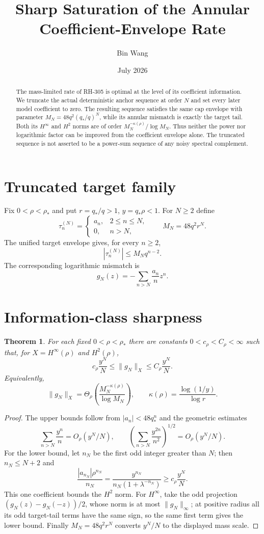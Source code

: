 \documentclass[11pt]{article}
\title{Sharp Saturation of the Annular Coefficient-Envelope Rate}
\author{Bin Wang}\date{July 2026}
\newtheorem{theorem}{Theorem}[section]
\theoremstyle{remark}\newtheorem{remark}[theorem]{Remark}
\begin{document}
\maketitle
\begin{abstract}
The mass-limited rate of RH-305 is optimal at the level of its coefficient
information.  We truncate the actual deterministic anchor sequence at order
$N$ and set every later model coefficient to zero.  The resulting sequence
satisfies the same cap envelope with parameter
$M_N=48q^2(q_*/q)^N$, while its annular mismatch is exactly the target tail.
Both its $H^\infty$ and $H^2$ norms are of order
$M_N^{-\kappa(\rho)}/\log M_N$.  Thus neither the power nor logarithmic
factor can be improved from the coefficient envelope alone.  The truncated
sequence is not asserted to be a power-sum sequence of any noisy spectral
complement.
\end{abstract}

\section{Truncated target family}
Fix $0<\rho<\rho_*$ and put $r=q_*/q>1$, $y=q_*\rho<1$.  For $N\ge2$ define
\[
 \tau_n^{(N)}=
 \begin{cases}a_n,&2\le n\le N,\\0,&n>N,\end{cases}
 \qquad
 M_N=48q^2r^N.
\]
The unified target envelope gives, for every $n\ge2$,
\[
 |\tau_n^{(N)}|\le M_Nq^{n-2}.
\]
The corresponding logarithmic mismatch is
\[
 g_N(z)=-\sum_{n>N}\frac{a_n}{n}z^n.
\]

\section{Information-class sharpness}
\begin{theorem}\label{thm:sharp}
For each fixed $0<\rho<\rho_*$ there are constants
$0<c_\rho<C_\rho<\infty$ such that, for
$X=H^\infty(\rho)$ and $H^2(\rho)$,
\[
 c_\rho\frac{y^N}{N}
 \le\|g_N\|_X\le
 C_\rho\frac{y^N}{N}.
\]
Equivalently,
\[
 \|g_N\|_X
 =\Theta_\rho\left(
 \frac{M_N^{-\kappa(\rho)}}{\log M_N}
 \right),
 \qquad
 \kappa(\rho)=\frac{\log(1/y)}{\log r}.
\]
\end{theorem}
\begin{proof}
The upper bounds follow from $|a_n|<48q_*^n$ and the geometric estimates
\[
 \sum_{n>N}\frac{y^n}{n}=O_\rho(y^N/N),\qquad
 \left(\sum_{n>N}\frac{y^{2n}}{n^2}\right)^{1/2}
 =O_\rho(y^N/N).
\]
For the lower bound, let $n_N$ be the first odd integer greater than $N$;
then $n_N\le N+2$ and
\[
 \frac{|a_{n_N}|\rho^{n_N}}{n_N}
 =\frac{y^{n_N}}
 {n_N(1+\lambda^{-n_N})}
 \ge c_\rho\frac{y^N}{N}.
\]
This one coefficient bounds the $H^2$ norm.  For $H^\infty$, take the odd
projection $(g_N(z)-g_N(-z))/2$, whose norm is at most $\|g_N\|_\infty$;
at positive radius all its odd target-tail terms have the same sign, so the
same first term gives the lower bound.  Finally
$M_N=48q^2r^N$ converts $y^N/N$ to the displayed mass scale.
\end{proof}
\end{document}
